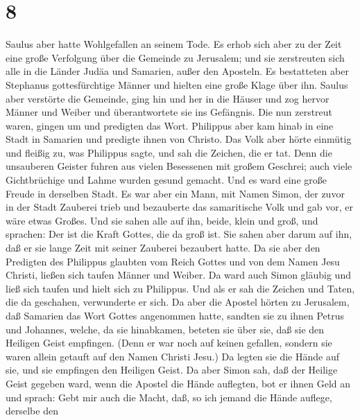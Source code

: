 \hypertarget{section-7}{%
\section{8}\label{section-7}}

 Saulus aber hatte Wohlgefallen an seinem Tode. Es erhob
sich aber zu der Zeit eine große Verfolgung über die Gemeinde zu
Jerusalem; und sie zerstreuten sich alle in die Länder Judäa und
Samarien, außer den Aposteln.  Es bestatteten aber Stephanus
gottesfürchtige Männer und hielten eine große Klage über ihn.
 Saulus aber verstörte die Gemeinde, ging hin und her in die
Häuser und zog hervor Männer und Weiber und überantwortete sie ins
Gefängnis.  Die nun zerstreut waren, gingen um und predigten
das Wort.  Philippus aber kam hinab in eine Stadt in
Samarien und predigte ihnen von Christo.  Das Volk aber
hörte einmütig und fleißig zu, was Philippus sagte, und sah die Zeichen,
die er tat.  Denn die unsauberen Geister fuhren aus vielen
Besessenen mit großem Geschrei; auch viele Gichtbrüchige und Lahme
wurden gesund gemacht.  Und es ward eine große Freude in
derselben Stadt.  Es war aber ein Mann, mit Namen Simon, der
zuvor in der Stadt Zauberei trieb und bezauberte das samaritische Volk
und gab vor, er wäre etwas Großes.  Und sie sahen alle auf
ihn, beide, klein und groß, und sprachen: Der ist die Kraft Gottes, die
da groß ist.  Sie sahen aber darum auf ihn, daß er sie
lange Zeit mit seiner Zauberei bezaubert hatte.  Da sie
aber den Predigten des Philippus glaubten vom Reich Gottes und von dem
Namen Jesu Christi, ließen sich taufen Männer und Weiber. 
Da ward auch Simon gläubig und ließ sich taufen und hielt sich zu
Philippus. Und als er sah die Zeichen und Taten, die da geschahen,
verwunderte er sich.  Da aber die Apostel hörten zu
Jerusalem, daß Samarien das Wort Gottes angenommen hatte, sandten sie zu
ihnen Petrus und Johannes,  welche, da sie hinabkamen,
beteten sie über sie, daß sie den Heiligen Geist empfingen.
 (Denn er war noch auf keinen gefallen, sondern sie waren
allein getauft auf den Namen Christi Jesu.)  Da legten sie
die Hände auf sie, und sie empfingen den Heiligen Geist. 
Da aber Simon sah, daß der Heilige Geist gegeben ward, wenn die Apostel
die Hände auflegten, bot er ihnen Geld an  und sprach: Gebt
mir auch die Macht, daß, so ich jemand die Hände auflege, derselbe den
